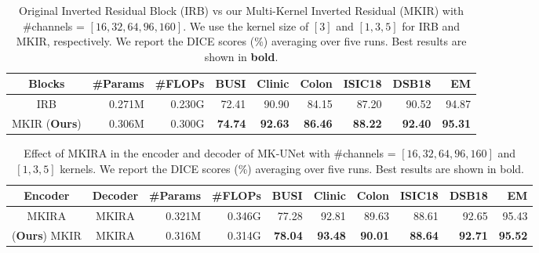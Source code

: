 \begin{table}[t]
  \centering
    \begin{adjustbox}{width=0.65\textwidth}
\begin{tabular}{c|r|r|r|r|r|r|r|r}
\toprule
Blocks     & \#Params & \#FLOPs & BUSI & Clinic & Colon & ISIC18 & DSB18 & EM                    \\
\midrule
IRB          & 0.271M     & 0.230G     & 72.41  & 90.90 & 84.15 & 87.20 & 90.52 & 94.87  \\
MKIR (\textbf{Ours})         & 0.306M    & 0.300G     & \textbf{74.74} & \textbf{92.63} & \textbf{86.46} & \textbf{88.22} & \textbf{92.40} & \textbf{95.31}         \\
\bottomrule 
\end{tabular}
\end{adjustbox}
\vspace{-0.2cm}
\caption{Original Inverted Residual Block (IRB) \cite{sandler2018mobilenetv2} vs our Multi-Kernel Inverted Residual (MKIR) with \#channels = $[16,32,64,96,160]$. We use the kernel size of $[3]$ and $[1,3,5]$ for IRB and MKIR, respectively. We report the DICE scores (\%) averaging over five runs. Best results are shown in \textbf{bold}.}
\vspace{-0.2cm}
\label{tab:ablation_irb_vs_mkir}
\end{table}

\begin{table}[!h]
\begin{center}
    \begin{adjustbox}{width=0.7\textwidth}
\begin{tabular}{c|c|r|r|r|r|r|r|r|r}
\toprule
Encoder  & Decoder   & \#Params & \#FLOPs & BUSI & Clinic & Colon & ISIC18 & DSB18 & EM                    \\
\midrule
MKIRA & MKIRA         & 0.321M    & 0.346G    &  77.28 & 92.81 & 89.63 &  88.61 & 92.65 & 95.43     \\
(\textbf{Ours}) MKIR & MKIRA        & 0.316M    & 0.314G    & \textbf{78.04} & \textbf{93.48} & \textbf{90.01} & \textbf{88.64} & \textbf{92.71} & \textbf{95.52}       \\
\bottomrule 
\end{tabular}
\end{adjustbox}
\vspace{-0.2cm}
\caption{Effect of MKIRA in the encoder and decoder of MK-UNet with \#channels = $[16,32,64,96,160]$ and $[1,3,5]$ kernels. We report the DICE scores (\%) averaging over five runs. Best results are shown in bold.}
\label{tab:ablation_mkir_vs_mkira_encoder}
\end{center}
\vspace{-0.5cm}
\end{table}

